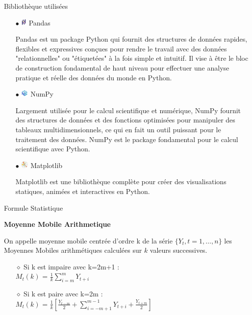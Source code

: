 \begin{center}	Bibliothèque utilisées \end{center} 
\begin{itemize}
	\item[$\bullet$] \includegraphics[height=1em]{icons/pandas-icon.png} Pandas
	\par{Pandas est un package Python qui fournit des structures de données rapides,
	flexibles et expressives conçues pour rendre le travail avec des données 
	"relationnelles" ou "étiquetées" à la fois simple et intuitif. Il vise à être 
	le bloc de construction fondamental de haut niveau pour effectuer une analyse 
	pratique et réelle des données du monde en Python.}

	\item[$\bullet$] \includegraphics[height=1em]{icons/numpy-icon.png} NumPy
	\par{Largement utilisée pour le calcul scientifique et numérique, NumPy fournit 
	des structures de données et des fonctions optimisées pour manipuler des 
	tableaux multidimensionnels, ce qui en fait un outil puissant pour le traitement 
	des données. NumPy est le package fondamental pour le calcul scientifique avec Python.}

	\item[$\bullet$] \includegraphics[height=1em]{icons/matplotlib-icon.png} Matplotlib
	\par{Matplotlib est une bibliothèque complète pour créer des visualisations statiques, 
	animées et interactives en Python.}
\end{itemize}

\begin{center}	Formule Statistique \end{center} 

\textbf{Moyenne Mobile Arithmetique}
\par{On appelle moyenne mobile centrée d'ordre k de la série $\{Y_t, t=1,\ldots,n\}$ les
Moyennes Mobiles arithmétiques calculées sur $k$ valeurs successives.}
\begin{itemize}
\item[$\diamond$] Si  k est impaire avec k=2m+1 :\\ 
\large{$M_{t}(k)$ = $\frac{1}{k}\sum_{i=m}^{m}Y_{t+i}$}
\item[$\diamond$] Si  k est paire avec k=2m :\\
\large{$M_t(k)$ = $\frac{1}{k}\left[\frac{Y_{t-m}}{2}+ \sum_{i=-m+1}^{m-1}Y_{t+i} + \frac{Y_{t+m}}{2}\right]$ }\\
\end{itemize}


